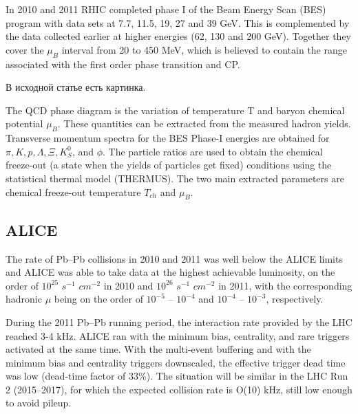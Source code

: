 
In 2010 and 2011 RHIC completed phase I of the Beam Energy Scan (BES) program with data sets at 7.7, 11.5, 19, 27 and 39 GeV. This is complemented by the data collected earlier at higher energies (62, 130 and 200 GeV). Together they cover the $\mu_{B}$ interval from 20 to 450 MeV, which is believed to contain the range associated with the first order phase transition and CP.

В исходной статье есть картинка.


The QCD phase diagram is the variation of temperature T and baryon chemical potential $\mu_{B}$. These quantities can be extracted from the measured hadron yields. Transverse momentum spectra for the BES Phase-I energies are obtained for $\pi, K, p, \Lambda, \Xi, K^{0}_{S}$, and $\phi$. The particle ratios are used to obtain the chemical freeze-out (a state when the yields of particles get fixed) conditions using the statistical thermal model (THERMUS). The two main extracted parameters are chemical freeze-out temperature $T_{ch}$ and $\mu_{B}$. 


\subsection{ALICE}

The rate of Pb–Pb collisions in 2010 and 2011 was well below the ALICE limits and ALICE was able to take data at the highest achievable luminosity, on the order of $10^25$ $s^{-1}$ $cm^{-2}$ in 2010 and $10^{26}$ $s^{-1}$ $cm^{-2}$ in 2011, with the corresponding hadronic $\mu$ being on the order of $10^{-5}$ -- $10^{-4}$ and $10^{-4}$ -- $10^{-3}$, respectively.


During the 2011 Pb--Pb running period, the interaction rate provided by the LHC reached 3-4 kHz. ALICE ran with the minimum bias, centrality, and rare triggers activated at the same time. With the multi-event buffering and with the minimum bias and centrality triggers downscaled, the effective trigger dead time was low (dead-time factor of 33\%). The situation will be similar in the LHC Run 2 (2015--2017), for which the expected collision rate is O(10) kHz, still low enough to avoid pileup.



